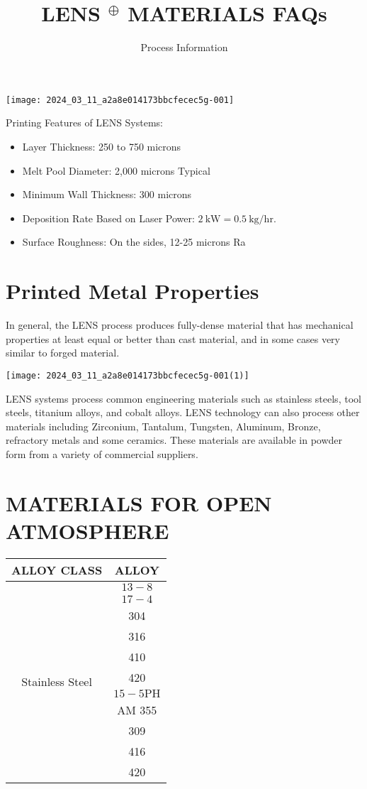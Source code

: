 \documentclass[10pt]{article}
\title{LENS $^{\oplus}$ MATERIALS FAQs }
\author{Process Information}
\date{}
\begin{document}
\maketitle
\begin{center}
\texttt{[image: 2024\_03\_11\_a2a8e014173bbcfecec5g-001]}
\end{center}

Printing Features of LENS Systems:

\begin{itemize}
  \item Layer Thickness: 250 to 750 microns
  \item Melt Pool Diameter: 2,000 microns Typical
  \item Minimum Wall Thickness: 300 microns
  \item Deposition Rate Based on Laser Power: $2 \mathrm{~kW}=0.5 \mathrm{~kg} / \mathrm{hr}$.
  \item Surface Roughness: On the sides, 12-25 microns Ra
\end{itemize}

\section*{Printed Metal Properties}
In general, the LENS process produces fully-dense material that has mechanical properties at least equal or better than cast material, and in some cases very similar to forged material.

\begin{center}
\texttt{[image: 2024\_03\_11\_a2a8e014173bbcfecec5g-001(1)]}
\end{center}

LENS systems process common engineering materials such as stainless steels, tool steels, titanium alloys, and cobalt alloys. LENS technology can also process other materials including Zirconium, Tantalum, Tungsten, Aluminum, Bronze, refractory metals and some ceramics. These materials are available in powder form from a variety of commercial suppliers.

\section*{MATERIALS FOR OPEN ATMOSPHERE}
\begin{center}
\begin{tabular}{|c|c|}
\hline
ALLOY CLASS & ALLOY \\
\hline
\multirow{11}{*}{Stainless Steel} & $13-8$ \\
\hline
 & $17-4$ \\
\hline
 & 304 \\
\hline
 & 316 \\
\hline
 & 410 \\
\hline
 & 420 \\
\hline
 & $15-5 \mathrm{PH}$ \\
\hline
 & AM 355 \\
\hline
 & 309 \\
\hline
 & 416 \\
\hline
 & 420 \\
\hline
\end{tabular}
\end{center}
\end{document}
